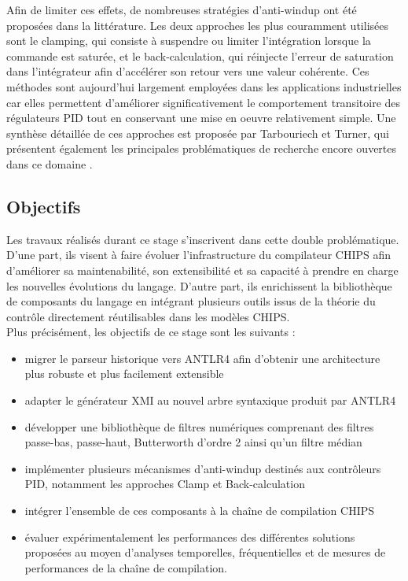 Afin de limiter ces effets, de nombreuses stratégies d'anti-windup ont été proposées dans la littérature. Les deux approches les plus couramment utilisées sont le clamping, qui consiste à suspendre ou limiter l'intégration lorsque la commande est saturée, et le back-calculation, qui réinjecte l'erreur de saturation dans l'intégrateur afin d'accélérer son retour vers une valeur cohérente. Ces méthodes sont aujourd'hui largement employées dans les applications industrielles car elles permettent d'améliorer significativement le comportement transitoire des régulateurs PID tout en conservant une mise en oeuvre relativement simple. Une synthèse détaillée de ces approches est proposée par Tarbouriech et Turner, qui présentent également les principales problématiques de recherche encore ouvertes dans ce domaine \cite{tarbouriech2009}. \\

\subsection{Objectifs}

Les travaux réalisés durant ce stage s'inscrivent dans cette double problématique. D'une part, ils visent à faire évoluer l'infrastructure du compilateur CHIPS afin d'améliorer sa maintenabilité, son extensibilité et sa capacité à prendre en charge les nouvelles évolutions du langage. D'autre part, ils enrichissent la bibliothèque de composants du langage en intégrant plusieurs outils issus de la théorie du contrôle directement réutilisables dans les modèles CHIPS. \\

Plus précisément, les objectifs de ce stage sont les suivants :
\begin{itemize}
    \item migrer le parseur historique vers ANTLR4 afin d'obtenir une architecture plus robuste et plus 
    facilement extensible
    \item adapter le générateur XMI au nouvel arbre syntaxique produit par ANTLR4
    \item développer une bibliothèque de filtres numériques comprenant des filtres passe-bas, passe-haut, 
    Butterworth d'ordre 2 ainsi qu'un filtre médian
    \item implémenter plusieurs mécanismes d'anti-windup destinés aux contrôleurs PID, notamment les 
    approches Clamp et Back-calculation
    \item intégrer l'ensemble de ces composants à la chaîne de compilation CHIPS
    \item évaluer expérimentalement les performances des différentes solutions proposées au moyen d'analyses 
    temporelles, fréquentielles et de mesures de performances de la chaîne de compilation.
\end{itemize}

